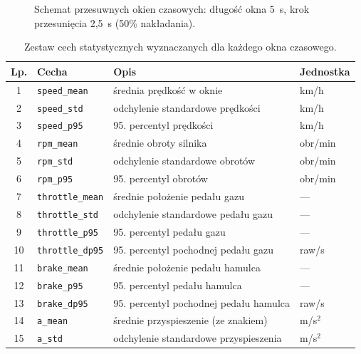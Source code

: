 \begin{figure}[!h]
    \centering
    \resizebox{0.85\linewidth}{!}{}
    \caption{Schemat przesuwnych okien czasowych: długość okna 5~s, krok przesunięcia 2,5~s (50\% nakładania).}
    \label{fig:okna-czasowe}
\end{figure}

\begin{table}[!h]
    \centering
    \caption{Zestaw cech statystycznych wyznaczanych dla każdego okna czasowego.}
    \label{tab:cechy}
    \begin{tabular}{| c | p{3.3cm} | p{7.2cm} | p{1.7cm} |} \hline
        \textbf{Lp.} & \textbf{Cecha} & \textbf{Opis} & \textbf{Jednostka} \\ \hline\hline
        1  & \texttt{speed\_mean}    & średnia prędkość w oknie & km/h \\ \hline
        2  & \texttt{speed\_std}     & odchylenie standardowe prędkości & km/h \\ \hline
        3  & \texttt{speed\_p95}     & 95. percentyl prędkości & km/h \\ \hline
        4  & \texttt{rpm\_mean}      & średnie obroty silnika & obr/min \\ \hline
        5  & \texttt{rpm\_std}       & odchylenie standardowe obrotów & obr/min \\ \hline
        6  & \texttt{rpm\_p95}       & 95. percentyl obrotów & obr/min \\ \hline
        7  & \texttt{throttle\_mean} & średnie położenie pedału gazu & --- \\ \hline
        8  & \texttt{throttle\_std}  & odchylenie standardowe pedału gazu & --- \\ \hline
        9  & \texttt{throttle\_p95}  & 95. percentyl pedału gazu & --- \\ \hline
        10 & \texttt{throttle\_dp95} & 95. percentyl pochodnej pedału gazu & raw/s \\ \hline
        11 & \texttt{brake\_mean}    & średnie położenie pedału hamulca & --- \\ \hline
        12 & \texttt{brake\_p95}     & 95. percentyl pedału hamulca & --- \\ \hline
        13 & \texttt{brake\_dp95}    & 95. percentyl pochodnej pedału hamulca & raw/s \\ \hline
        14 & \texttt{a\_mean}        & średnie przyspieszenie (ze znakiem) & m/s$^2$ \\ \hline
        15 & \texttt{a\_std}         & odchylenie standardowe przyspieszenia & m/s$^2$ \\ \hline

\end{tabular}
\end{table}

